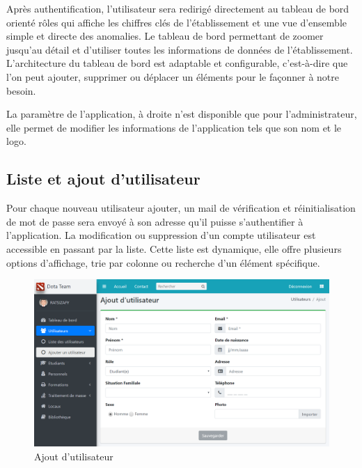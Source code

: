 Après authentification, l’utilisateur sera redirigé directement au tableau de bord orienté
rôles qui affiche les chiffres clés de l’établissement et une vue d’ensemble simple et directe
des anomalies. Le tableau de bord permettant de zoomer jusqu’au détail et d’utiliser
toutes les informations de données de l’établissement. L’architecture du tableau de bord
est adaptable et configurable, c’est-à-dire que l’on peut ajouter, supprimer ou déplacer
un éléments pour le façonner à notre besoin.
\medskip

La paramètre de l'application, à droite n'est disponible que pour l'administrateur, elle permet de modifier les informations de l'application tels que son nom et le logo.

\subsection{Liste et ajout d’utilisateur}
Pour chaque nouveau utilisateur ajouter, un mail de vérification et réinitialisation de mot de passe sera envoyé à son adresse qu’il puisse s’authentifier à l’application.
La modification ou suppression d’un compte utilisateur est accessible en passant par la
liste. Cette liste est dynamique, elle offre plusieurs options d’affichage, trie par colonne ou recherche d’un élément spécifique.

\begin{figure}[h]
	\centering
	\hspace*{-1.8cm}
	\includegraphics[width=1.2\linewidth]{"Chapitre5/images/ajoutUtil"}
	\caption{Ajout d'utilisateur}
	\label{Ajout d'utilisateur}
\end{figure}

